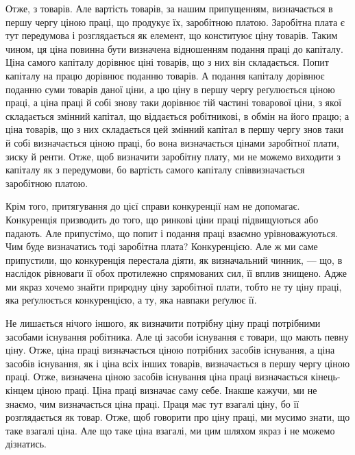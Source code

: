 \parcont{}  %
Отже, з товарів. Але вартість товарів, за нашим припущенням, визначається
в першу чергу ціною праці, що продукує їх, заробітною платою. Заробітна плата
є тут передумова і розглядається як елемент, що конституює ціну товарів. Таким
чином, ця ціна повинна бути визначена відношенням подання праці до капіталу.
Ціна самого капіталу дорівнює ціні товарів, що з них він складається. Попит
капіталу на працю дорівнює поданню товарів. А подання капіталу дорівнює
поданню суми товарів даної ціни, а цю ціну в першу чергу реґулюється
ціною праці, а ціна праці й собі знову таки дорівнює тій частині товарової
ціни, з якої складається змінний капітал, що віддається робітникові, в
обмін на його працю; а ціна товарів, що з них складається цей змінний капітал
в першу чергу знов таки й собі визначається ціною праці, бо вона визначається
цінами заробітної плати, зиску й ренти. Отже, щоб визначити заробітну плату,
ми не можемо виходити з капіталу як з передумови, бо вартість самого капіталу
співвизначається заробітною платою.

Крім того, притягування до цієї справи конкуренції нам не допомагає.
Конкуренція призводить до того, що ринкові ціни праці підвищуються
або падають. Але припустімо, що попит і подання праці взаємно урівноважуються.
Чим буде визначатись тоді заробітна плата? Конкуренцією. Але ж
ми саме припустили, що конкуренція перестала діяти, як визначальний чинник,
— що, в наслідок рівноваги її обох протилежно спрямованих сил, її вплив
знищено. Адже ми якраз хочемо знайти природну ціну заробітної плати,
тобто не ту ціну праці, яка реґулюється конкуренцією, а ту, яка навпаки
реґулює її.

Не лишається нічого іншого, як визначити потрібну ціну праці потрібними
засобами існування робітника. Але ці засоби існування є товари, що мають
певну ціну. Отже, ціна праці визначається ціною потрібних засобів існування,
а ціна засобів існування, як і ціна всіх інших товарів, визначається в першу
чергу ціною праці. Отже, визначена ціною засобів існування ціна праці визначається
кінець-кінцем ціною праці. Ціна праці визначає саму себе. Інакше кажучи,
ми не знаємо, чим визначається ціна праці. Праця має тут взагалі ціну,
бо її розглядається як товар. Отже, щоб говорити про ціну праці, ми мусимо
знати, що таке взагалі ціна. Але що таке ціна взагалі, ми цим шляхом якраз
і не можемо дізнатись.


